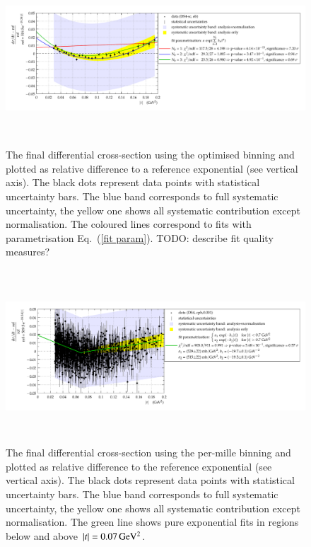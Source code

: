 \begin{figure}
\vskip-5mm
\begin{center}
\includegraphics[height=6.5cm]{fig/t_dist_rel_with_fits.pdf}
\vskip-6mm
\caption{%
The final differential cross-section using the optimised binning and plotted as relative difference to a reference exponential (see vertical axis). The black dots represent data points with statistical uncertainty bars. The blue band corresponds to full systematic uncertainty, the yellow one shows all systematic contribution except normalisation. The coloured lines correspond to fits with parametrisation Eq.~(\ref{fit param}).
TODO: describe fit quality measures?}
\label{fig:data rel ob}
\end{center}
\vskip-2mm
\end{figure}

\begin{figure}
\begin{center}
\includegraphics[height=6.5cm]{fig/t_dist_rel_with_split_fit.pdf}
\vskip-6mm
\caption{
The final differential cross-section using the per-mille binning and plotted as relative difference to the reference exponential (see vertical axis). The black dots represent data points with statistical uncertainty bars. The blue band corresponds to full systematic uncertainty, the yellow one shows all systematic contribution except normalisation. The green line shows pure exponential fits in regions below and above $|t| = 0.07\,{\rm GeV^2}$.
}
\label{fig:data rel cpb0.001}
\end{center}
\end{figure}

